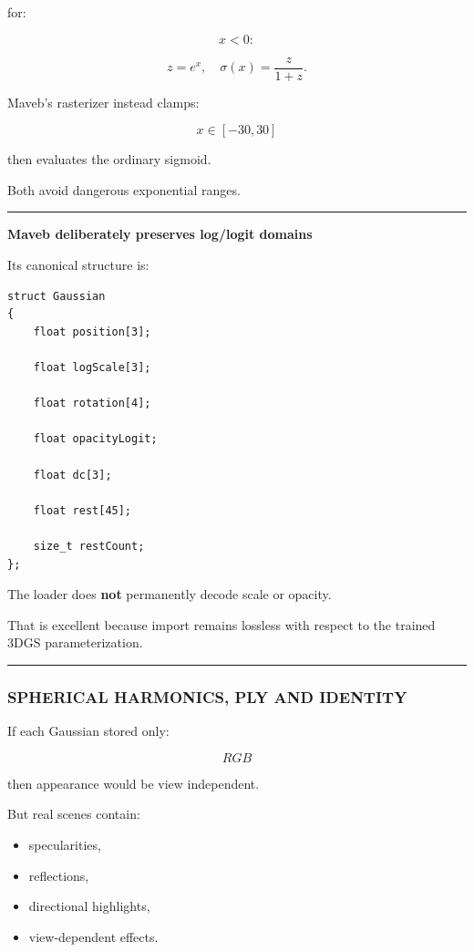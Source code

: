 for:

\[
x<0:
\]

\[
z=e^x,
\quad
\sigma(x)=\frac{z}{1+z}.
\]

Maveb's rasterizer instead clamps:

\[
x\in[-30,30]
\]

then evaluates the ordinary sigmoid.

Both avoid dangerous exponential ranges.

\begin{center}\rule{0.5\linewidth}{0.5pt}\end{center}

\textbf{Maveb deliberately preserves log/logit domains}

Its canonical structure is:

\begin{verbatim}
struct Gaussian
{
    float position[3];

    float logScale[3];

    float rotation[4];

    float opacityLogit;

    float dc[3];

    float rest[45];

    size_t restCount;
};
\end{verbatim}

The loader does \textbf{not} permanently decode scale or opacity.

That is excellent because import remains lossless with respect to the trained 3DGS parameterization.

\begin{center}\rule{0.5\linewidth}{0.5pt}\end{center}

\subsubsection{SPHERICAL HARMONICS, PLY AND IDENTITY}\label{04-visual-computing-ii-ch037-spherical-harmonics-ply-and-identity}

If each Gaussian stored only:

\[
RGB
\]

then appearance would be view independent.

But real scenes contain:

\begin{itemize}
\tightlist
\item
  specularities,
\item
  reflections,
\item
  directional highlights,
\item
  view-dependent effects.
\end{itemize}

